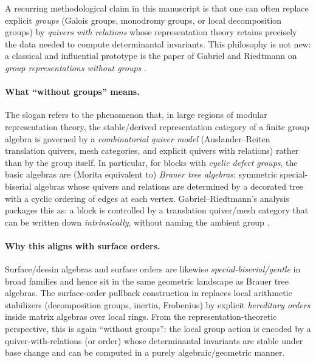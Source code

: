 \documentclass[11pt,oneside]{amsbook}
\numberwithin{equation}{section}
\theoremstyle{plain}
\theoremstyle{definition}
\theoremstyle{remark}
\begin{document}
A recurring methodological claim in this manuscript is that one can often replace explicit \emph{groups} (Galois groups, monodromy groups, or local decomposition groups) by \emph{quivers with relations} whose representation theory retains precisely the data needed to compute determinantal invariants.
This philosophy is not new: a classical and influential prototype is the paper of Gabriel and Riedtmann on \emph{group representations without groups} \cite{GabrielRiedtmann1979WithoutGroups}.

\paragraph{What ``without groups'' means.}
The slogan refers to the phenomenon that, in large regions of modular representation theory, the stable/derived representation category of a finite group algebra is governed by a \emph{combinatorial quiver model} (Auslander--Reiten translation quivers, mesh categories, and explicit quivers with relations) rather than by the group itself.
In particular, for blocks with \emph{cyclic defect groups}, the basic algebras are (Morita equivalent to) \emph{Brauer tree algebras}: symmetric special-biserial algebras whose quivers and relations are determined by a decorated tree with a cyclic ordering of edges at each vertex.
Gabriel--Riedtmann's analysis packages this as: a block is controlled by a translation quiver/mesh category that can be written down \emph{intrinsically}, without naming the ambient group \cite{GabrielRiedtmann1979WithoutGroups}.

\paragraph{Why this aligns with surface orders.}
Surface/dessin algebras and surface orders are likewise \emph{special-biserial/gentle} in broad families and hence sit in the same geometric landscape as Brauer tree algebras.
The surface-order pullback construction in \cite{Schreiber2018SurfaceAlgebrasI} replaces local arithmetic stabilizers
(decomposition groups, inertia, Frobenius)
by explicit \emph{hereditary orders} inside matrix algebras over local rings.
From the representation-theoretic perspective, this is again ``without groups'': the local group action is encoded by a quiver-with-relations (or order) whose determinantal invariants are stable under base change and can be computed in a purely algebraic/geometric manner.
\end{document}
